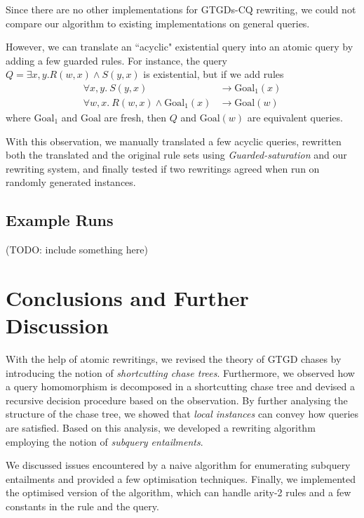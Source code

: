 \documentclass[12pt]{report}
\theoremstyle{plain}
\theoremstyle{definition}
\begin{document}
Since there are no other implementations for GTGDs-CQ rewriting, we could not compare our algorithm to existing implementations on general queries.

However, we can translate an ``acyclic" existential query into an atomic query by adding a few guarded rules. For instance, the query $Q = \exists x, y. R(w, x) \wedge S(y, x)$ is existential, but if we add rules \begin{align*}
  \forall x, y.\ S(y, x) &\rightarrow \mathrm{Goal}_1(x) \\
  \forall w, x.\ R(w, x) \wedge \mathrm{Goal}_1(x) &\rightarrow \mathrm{Goal}(w)
\end{align*}
where $\mathrm{Goal}_1$ and $\mathrm{Goal}$ are fresh, then $Q$ and $\mathrm{Goal}(w)$ are equivalent queries.

With this observation, we manually translated a few acyclic queries, rewritten both the translated and the original rule sets using \emph{Guarded-saturation} and our rewriting system, and finally tested if two rewritings agreed when run on randomly generated instances.

\section{Example Runs}
\label{section:example-runs}

(TODO: include something here)

\newpage
\chapter{Conclusions and Further Discussion}

With the help of atomic rewritings, we revised the theory of GTGD chases by introducing the notion of \emph{shortcutting chase trees}. Furthermore, we observed how a query homomorphism is decomposed in a shortcutting chase tree and devised a recursive decision procedure based on the observation. By further analysing the structure of the chase tree, we showed that \emph{local instances} can convey how queries are satisfied. Based on this analysis, we developed a rewriting algorithm employing the notion of \emph{subquery entailments}.

We discussed issues encountered by a naive algorithm for enumerating subquery entailments and provided a few optimisation techniques. Finally, we implemented the optimised version of the algorithm, which can handle arity-2 rules and a few constants in the rule and the query.
\end{document}

